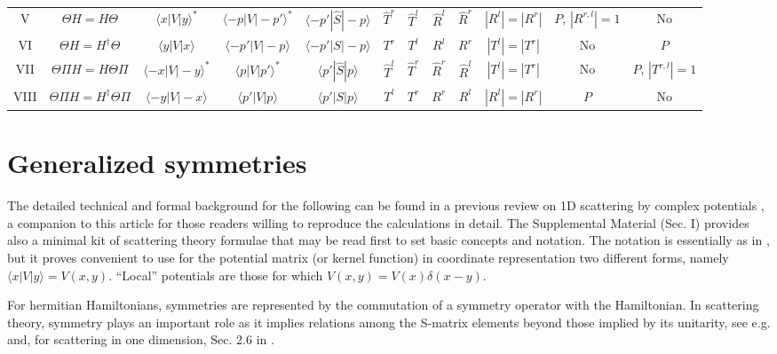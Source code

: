 \begin{landscape}
\begin{table}
{\begin{tabular}{cccccccccccc}
      \\
      V & $\Theta H=H\Theta$ &  $\langle x|V|y\rangle^*$& $\langle -p|V|-p'\rangle^*$ & $\langle -p'|\widehat{S}|-p\rangle$ & $\widehat{T}^r$ & $\widehat{T}^l$ & $\widehat{R}^l$& $\widehat{R}^r$
      &$|R^l|=|R^r|$&$P$, $|R^{r,l}|=1$&No
      \\
      VI & $\Theta H=H^\dagger\Theta$ &  $\langle y|V|x\rangle$& $\langle -p'|V|-p\rangle$ & $\langle -p'|S|-p\rangle$ & $T^r$& $T^l$ & $R^l$& $R^r$&$|T^l| = |T^r|$&No&$P$
      \\
      VII & $\Theta\Pi H=H\Theta \Pi$ &  $\langle -x|V|-y\rangle^*$ & $\langle p|V|p'\rangle^*$ & $\langle p'|\widehat{S}|p\rangle$ &$\widehat{T}^l$& $\widehat{T}^r$ & $\widehat{R}^r$& $\widehat{R}^l$&$|T^l|=|T^r|$&No&$P$, $|T^{r,l}|=1$
      \\
      VIII& $\Theta\Pi H=H^\dagger \Theta \Pi$ &  $\langle -y|V|-x\rangle$ & $\langle p'|V|p\rangle$ & $\langle p'|S|p\rangle$ & $T^l$ & $T^r$ & $R^r$ & $R^l$&$|R^l|=|R^r|$&$P$&No
    \end{tabular}}
  \end{table}
\end{landscape}





\section{Generalized symmetries}


The detailed technical and formal background for the following can be found in
a previous review on 1D scattering by complex potentials \cite{Muga2004}, a companion to this article
for those readers willing to reproduce the calculations in detail.
The Supplemental Material (Sec. I)  provides also a minimal kit of scattering theory formulae that may be
read first to set basic concepts and notation.
The notation is essentially as in \cite{Muga2004}, but it proves convenient to use
for the potential matrix (or kernel function) in coordinate representation
two different forms, namely $\langle x|V|y\rangle=V(x,y)$. ``Local'' potentials are those
for which $V(x,y)=V(x)\delta(x-y)$.



%
For hermitian  Hamiltonians, symmetries are represented by the commutation of
a symmetry operator with the Hamiltonian. In scattering theory, symmetry plays an important role  as it implies relations among
the S-matrix elements beyond those implied by its unitarity, see e.g. \cite{Taylor1972} and, for scattering in one dimension,
Sec. 2.6 in \cite{Muga2004}.

